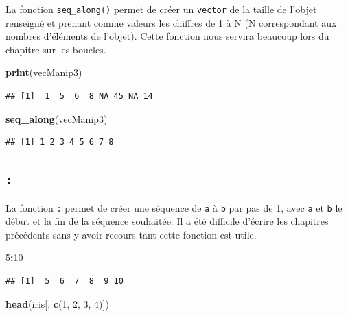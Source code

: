 \documentclass[
]{book}
\newenvironment{Shaded}{\begin{snugshade}}{\end{snugshade}}
\newcommand{\DecValTok}[1]{\textcolor[rgb]{0.00,0.00,0.81}{#1}}
\newcommand{\KeywordTok}[1]{\textcolor[rgb]{0.13,0.29,0.53}{\textbf{#1}}}
\newcommand{\NormalTok}[1]{#1}
\newcommand{\OperatorTok}[1]{\textcolor[rgb]{0.81,0.36,0.00}{\textbf{#1}}}
\begin{document}
La fonction \texttt{seq\_along()} permet de créer un \texttt{vector} de la taille de l'objet renseigné et prenant comme valeurs les chiffres de 1 à N (N correspondant aux nombres d'éléments de l'objet). Cette fonction nous servira beaucoup lors du chapitre sur les boucles.

\begin{Shaded}
\begin{Highlighting}[]
\KeywordTok{print}\NormalTok{(vecManip3)}
\end{Highlighting}
\end{Shaded}

\begin{verbatim}
## [1]  1  5  6  8 NA 45 NA 14
\end{verbatim}

\begin{Shaded}
\begin{Highlighting}[]
\KeywordTok{seq_along}\NormalTok{(vecManip3)}
\end{Highlighting}
\end{Shaded}

\begin{verbatim}
## [1] 1 2 3 4 5 6 7 8
\end{verbatim}

\hypertarget{l0152points}{%
\subsection{\texorpdfstring{\texttt{:}}{:}}\label{l0152points}}

La fonction \texttt{:} permet de créer une séquence de \texttt{a} à \texttt{b} par pas de 1, avec \texttt{a} et \texttt{b} le début et la fin de la séquence souhaitée. Il a été difficile d'écrire les chapitres précédents sans y avoir recours tant cette fonction est utile.

\begin{Shaded}
\begin{Highlighting}[]
\DecValTok{5}\OperatorTok{:}\DecValTok{10}
\end{Highlighting}
\end{Shaded}

\begin{verbatim}
## [1]  5  6  7  8  9 10
\end{verbatim}

\begin{Shaded}
\begin{Highlighting}[]
\KeywordTok{head}\NormalTok{(iris[, }\KeywordTok{c}\NormalTok{(}\DecValTok{1}\NormalTok{, }\DecValTok{2}\NormalTok{, }\DecValTok{3}\NormalTok{, }\DecValTok{4}\NormalTok{)])}
\end{Highlighting}
\end{Shaded}
\end{document}
